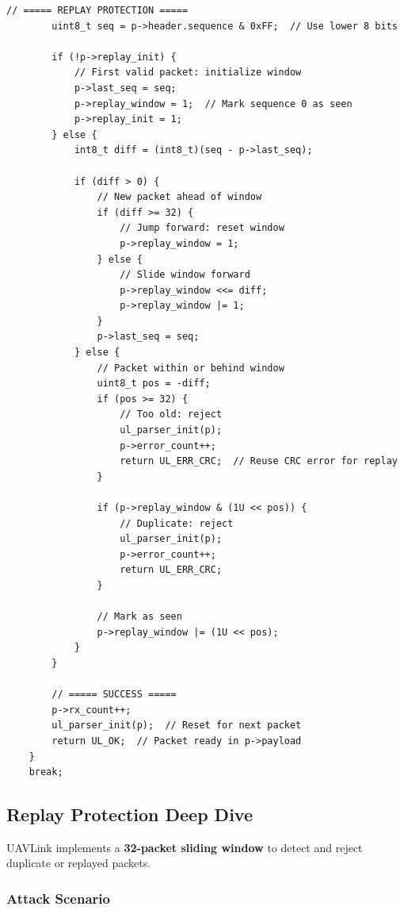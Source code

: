\documentclass[11pt,a4paper]{article}
\begin{document}
\begin{lstlisting}[caption={CRC State Implementation (Comprehensive)}]
        // ===== REPLAY PROTECTION =====
        uint8_t seq = p->header.sequence & 0xFF;  // Use lower 8 bits

        if (!p->replay_init) {
            // First valid packet: initialize window
            p->last_seq = seq;
            p->replay_window = 1;  // Mark sequence 0 as seen
            p->replay_init = 1;
        } else {
            int8_t diff = (int8_t)(seq - p->last_seq);
            
            if (diff > 0) {
                // New packet ahead of window
                if (diff >= 32) {
                    // Jump forward: reset window
                    p->replay_window = 1;
                } else {
                    // Slide window forward
                    p->replay_window <<= diff;
                    p->replay_window |= 1;
                }
                p->last_seq = seq;
            } else {
                // Packet within or behind window
                uint8_t pos = -diff;
                if (pos >= 32) {
                    // Too old: reject
                    ul_parser_init(p);
                    p->error_count++;
                    return UL_ERR_CRC;  // Reuse CRC error for replay
                }
                
                if (p->replay_window & (1U << pos)) {
                    // Duplicate: reject
                    ul_parser_init(p);
                    p->error_count++;
                    return UL_ERR_CRC;
                }
                
                // Mark as seen
                p->replay_window |= (1U << pos);
            }
        }

        // ===== SUCCESS =====
        p->rx_count++;
        ul_parser_init(p);  // Reset for next packet
        return UL_OK;  // Packet ready in p->payload
    }
    break;
\end{lstlisting}

\subsection{Replay Protection Deep Dive}

UAVLink implements a \textbf{32-packet sliding window} to detect and reject duplicate or replayed packets.

\subsubsection{Attack Scenario}
\end{document}
